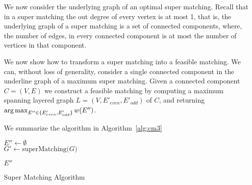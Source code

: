 We now consider the underlying graph of an optimal super matching.
Recall that in a super matching the out degree of every vertex is at most 1,
that is, the underlying graph of a super matching is a set of connected components,
where, the number of edges, 
in every connected component is at most the number of vertices in that component.

We now show how to transform a super matching into a feasible matching.
We can, without loss of generality, 
consider a single connected component in the underline graph of a maximum super matching.
Given a connected component $C = (V, E)$ we construct a feasible matching by
computing a maximum spanning layered graph $L = (V, E'_{even}, E'_{odd})$ of $C$,
and returning $\operatorname*{arg\,max}_{E'' \in \{ E'_{even}, E'_{odd} \}}{w(E'')} $. 

We summarize the algorithm in Algorithm~\ref{alg:cm3}

\begin{algorithm}
\label{alg:cm3}

$E'' \leftarrow \emptyset$								\\
$G' \leftarrow \text{superMatching($G$)}$				\\


\Return $E''$
\caption{Super Matching Algorithm}
\end{algorithm}
